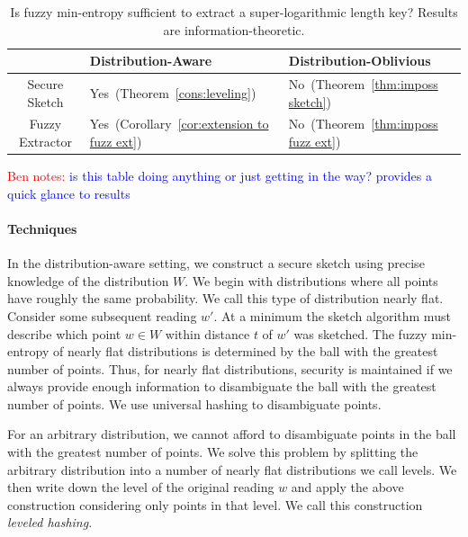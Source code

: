 \documentclass[11pt]{article}
\newcommand{\thref}[1]{\mbox{Theorem~\ref{#1}}}
\newcommand{\corref}[1]{\mbox{Corollary~\ref{#1}}}
\newcommand{\authnote}[2]{{\textcolor{red}{\textsf{#1 notes: }\textcolor{blue}{ #2}}\marginpar{\textcolor{red}{\textbf{!!!!!}}}}}
\newcommand{\authnote}[2]{}
\newcommand{\bnote}[1]{{\authnote{Ben}{#1}}}
\begin{document}
\begin{table}
\begin{center}
\begin{tabular}{c  l l }
 & Distribution-Aware & Distribution-Oblivious\\
\hline
Secure Sketch & Yes~(\thref{cons:leveling}) & No~(\thref{thm:imposs sketch})\\
\hline
Fuzzy Extractor & Yes~(\corref{cor:extension to fuzz ext}) & No~(\thref{thm:imposs fuzz ext}) 
\end{tabular}
\end{center}
\caption{Is fuzzy min-entropy sufficient to extract a super-logarithmic length key?  Results are information-theoretic.}
\label{tab:main results}
\end{table}
\bnote{is this table doing anything or just getting in the way?  provides a quick glance to results}

\paragraph{Techniques} In the distribution-aware setting, we construct a secure sketch using precise knowledge of the distribution $W$.  We begin with distributions where all points have roughly the same probability.  We call this type of distribution nearly flat.  Consider some subsequent reading $w'$. At a minimum the sketch algorithm must describe which point $w\in W$ within distance $t$ of $w'$ was sketched.  The fuzzy min-entropy of nearly flat distributions is determined by the ball with the greatest number of points.   Thus, for nearly flat distributions, security is maintained if we always provide enough information to disambiguate the ball with the greatest number of points.  We use universal hashing to disambiguate points.

For an arbitrary distribution, we cannot afford to disambiguate points in the ball with the greatest number of points.  We solve this problem by splitting the arbitrary distribution into a number of nearly flat distributions we call levels.  We then write down the level of the original reading $w$ and apply the above construction considering only points in that level.  We call this construction \emph{leveled hashing}.%
\end{document}
